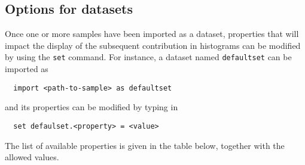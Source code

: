 \documentclass[a4paper]{article}
\begin{document}
\vspace{2cm}
\begin{shaded}
\section{\Large Options for datasets}
\end{shaded}

\noindent Once one or more samples have been imported as a dataset, properties that will
impact the display of the subsequent contribution in histograms can be modified
by using the \verb+set+ command. For instance, a dataset named \verb?defaultset?
can be imported as
{\color{ao} \begin{verbatim}
  import <path-to-sample> as defaultset
\end{verbatim}}
\noindent and its properties can be modified by typing in
{\color{ao} \begin{verbatim}
  set defaulset.<property> = <value>
\end{verbatim}}
\noindent The list of available properties is given in the table below, together with the
allowed values.
\renewcommand{\arraystretch}{1.2}%
\end{document}
